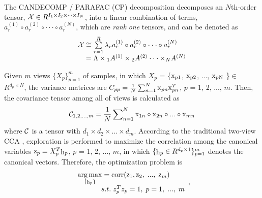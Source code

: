 \documentclass{sig-alternate-05-2015}
\begin{document}
The CANDECOMP / PARAFAC (CP) decomposition decomposes an $N$th-order tensor, ${\cal X} \in {R^{{I_1} \times {I_2} \times  \cdot  \cdot  \cdot  \times {I_N}}}$, into a linear combination of terms, $a_r^{(1)} \circ a_r^{(2)} \circ  \cdot  \cdot  \cdot  \circ a_r^{(N)}$, which are {\em rank} {\em one} tensors, and can be denoted as
\begin{equation}\label{}
\begin{array}{l}
{\cal X} \cong \sum\limits_{r = 1}^R {{\lambda _r}a_r^{(1)} \circ a_r^{(2)} \circ  \cdot  \cdot  \cdot  \circ a_r^{(N)}} \\
\;\;\;\; = \Lambda  \times {}_1{A^{(1)}} \times {}_2{A^{(2)}} \cdot  \cdot  \cdot  \times {}_N{A^{(N)}}\\
\end{array}
\end{equation}

Given $m$ views $\{X_p\}_{p=1}^m$ of samples, in which $X_p$ = \{$ \rm x_{p1}$, $ \rm x_{p2}$, ..., $\rm x_{pN}$ \}$\in$ $R^{d_p \times N}$, the variance matrices are ${C_{pp}} = \frac{1}{N}\sum\nolimits_{n = 1}^N {{{\mathop{\rm x}\nolimits} _{pn}}{\mathop{\rm x}\nolimits} _{pn}^T}$, $p$ = 1, 2, ..., $m$. Then, the covariance tensor among all of views is calculated as
\begin{equation}\label{}
{\cal C}_{1, 2, ..., m} = \frac{1}{N}\sum\nolimits_{n = 1}^N {{{\mathop{\rm x}\nolimits} _{1n}}
\circ {{\mathop{\rm x}\nolimits} _{2n}} \circ ... \circ {{\mathop{\rm x}\nolimits} _{mn}}}
\end{equation}
where $\cal C$ is a tensor with ${d_1} \times {d_2} \times ... \times {d_m}$. According to the traditional two-view CCA \cite{Hardoon2004Canonical}, exploration is performed to maximize the correlation among the canonical variables ${{\mathop{\rm z}\nolimits} _p} = X_p^T{{\mathop{\rm h}\nolimits} _p}$, $p$ = 1, 2, ..., $m$, in which $\{{{\mathop{\rm h}\nolimits} _p} \in {R^{{d_p} \times 1}}\}_{p=1}^m$ denotes the canonical vectors. Therefore, the optimization problem is
\begin{equation}\label{}
\begin{array}{l}
\mathop {\arg \max }\limits_{\{ {{\mathop{\rm h}\nolimits} _p}\} }  = {\mathop{\rm corr}\nolimits} ({{\mathop{\rm z}\nolimits} _1},{{\mathop{\rm z}\nolimits} _2},\;...,\;{{\mathop{\rm z}\nolimits} _m})\\
\;\;\;\;\;\;\;\;\;\;\;\;s.t.\;z_p^T{z_p} = 1,\;p = 1,\;...,\;m
\end{array},
\label{123}
\end{equation}
\end{document}
